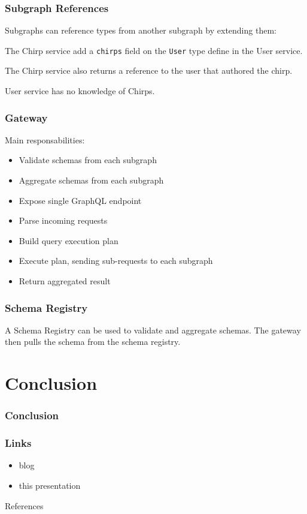 \documentclass[notes]{beamer}
\begin{document}
\begin{frame}
  \frametitle{Subgraph References}
  Subgraphs can reference types from another subgraph by extending them:

  



  The Chirp service add a \texttt{chirps} field on the \texttt{User} type define in the User service.

  The Chirp service also returns a reference to the user that authored the chirp.

  User service has no knowledge of Chirps.
\end{frame}

\begin{frame}
  \frametitle{Gateway} Main responsabilities:
  \begin{itemize}
  \item Validate schemas from each subgraph
  \item Aggregate schemas from each subgraph
  \item Expose single GraphQL endpoint
  \item Parse incoming requests
  \item Build query execution plan
  \item Execute plan, sending sub-requests to each subgraph
  \item Return aggregated result
  \end{itemize}
\end{frame}

\begin{frame}
  \frametitle{Schema Registry}
  A Schema Registry can be used to validate and aggregate schemas. The gateway then pulls the schema from the schema registry.
\end{frame}

\section{Conclusion}
\begin{frame}
  \frametitle{Conclusion}
\end{frame}

\begin{frame}
  \frametitle{Links}
  \begin{itemize}
  \item blog
  \item this presentation
  \end{itemize}
\end{frame}

\begin{frame}{References}
  \printbibliography{}
\end{frame}
\end{document}
